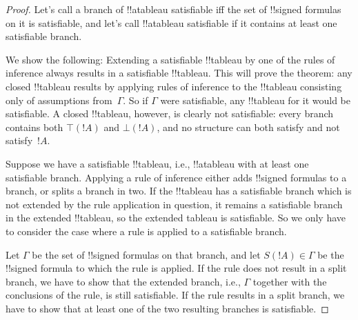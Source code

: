 \documentclass[10pt,a4paper]{article}
\theoremstyle{plain}
\theoremstyle{definition}
\theoremstyle{remark}
\providecommand{\sFmla}[2]{#1(#2)}
\providecommand{\True}{\top}
\providecommand{\False}{\bot}
\begin{document}
\begin{proof}
Let's call a branch of !!a{tableau} satisfiable iff the set of
!!{signed formula}s on it is satisfiable, and let's call !!a{tableau}
satisfiable if it contains at least one satisfiable branch.

We show the following: Extending a satisfiable !!{tableau} by one of
the rules of inference always results in a satisfiable !!{tableau}.
This will prove the theorem: any closed !!{tableau} results by
applying rules of inference to the !!{tableau} consisting only of
assumptions from~$\Gamma$. So if $\Gamma$ were satisfiable, any
!!{tableau} for it would be satisfiable. A closed !!{tableau},
however, is clearly not satisfiable: every branch contains both
$\sFmla{\True}{!A}$ and $\sFmla{\False}{!A}$, and no structure can
both satisfy and not satisfy~$!A$.

Suppose we have a satisfiable !!{tableau}, i.e., !!a{tableau} with at
least one satisfiable branch. Applying a rule of inference either adds
!!{signed formula}s to a branch, or splits a branch in two. If the
!!{tableau} has a satisfiable branch which is not extended by the rule
application in question, it remains a satisfiable branch in the
extended !!{tableau}, so the extended tableau is satisfiable. So we
only have to consider the case where a rule is applied to a
satisfiable branch.

Let $\Gamma$ be the set of !!{signed formula}s on that branch, and
let $\sFmla{S}{!A} \in \Gamma$ be the !!{signed formula} to which the
rule is applied. If the rule does not result in a split branch, we
have to show that the extended branch, i.e., $\Gamma$ together with
the conclusions of the rule, is still satisfiable. If the rule results
in a split branch, we have to show that at least one of the two
resulting branches is satisfiable.
  

\end{proof}
\end{document}
